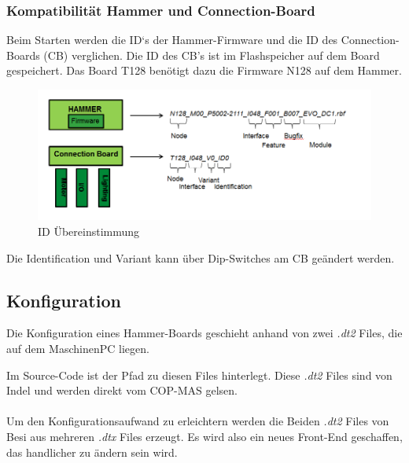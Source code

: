 		\subsubsection{Kompatibilität Hammer und Connection-Board}
			Beim Starten werden die ID`s der Hammer-Firmware und die ID des Connection-Boards (CB) verglichen. Die ID des CB's ist im Flashspeicher auf dem Board gespeichert. Das Board T128 benötigt dazu die Firmware N128 auf dem Hammer. 
			\begin{figure}[h!]
				\centering
				\includegraphics[width=0.8\linewidth]{./pics/ccp/connectionboard.png}
				\caption{ID Übereinstimmung}
			\end{figure}
			Die Identification und Variant kann über Dip-Switches am CB geändert werden. 
		
	\subsection{Konfiguration}
		Die Konfiguration eines Hammer-Boards geschieht anhand von zwei \textit{.dt2} Files, die auf dem MaschinenPC liegen.
		
		Im Source-Code ist der Pfad zu diesen Files hinterlegt. Diese \textit{.dt2} Files sind von Indel und werden direkt vom COP-MAS gelsen.
		\\\\
		Um den Konfigurationsaufwand zu erleichtern werden die Beiden \textit{.dt2} Files von Besi aus mehreren \textit{.dtx} Files erzeugt. Es wird also ein neues Front-End geschaffen, das handlicher zu ändern sein wird.
		



	